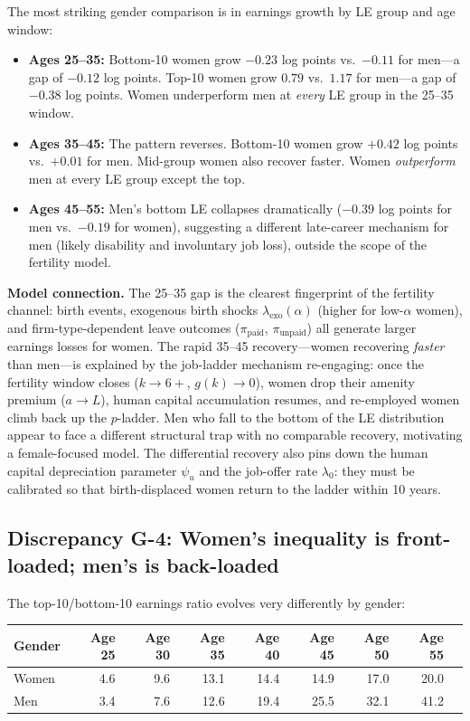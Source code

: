\documentclass[11pt]{article}
\begin{document}
The most striking gender comparison is in earnings growth by LE group and age window:
\begin{itemize}[nosep]
  \item \textbf{Ages 25--35:} Bottom-10 women grow $-0.23$ log points vs.\ $-0.11$ for men---a gap of $-0.12$ log points. Top-10 women grow $0.79$ vs.\ $1.17$ for men---a gap of $-0.38$ log points. Women underperform men at \emph{every} LE group in the 25--35 window.
  \item \textbf{Ages 35--45:} The pattern reverses. Bottom-10 women grow $+0.42$ log points vs.\ $+0.01$ for men. Mid-group women also recover faster. Women \emph{outperform} men at every LE group except the top.
  \item \textbf{Ages 45--55:} Men's bottom LE collapses dramatically ($-0.39$ log points for men vs.\ $-0.19$ for women), suggesting a different late-career mechanism for men (likely disability and involuntary job loss), outside the scope of the fertility model.
\end{itemize}

\medskip\noindent\textbf{Model connection.} The 25--35 gap is the clearest fingerprint of the fertility channel: birth events, exogenous birth shocks $\lambda_{\text{exo}}(\alpha)$ (higher for low-$\alpha$ women), and firm-type-dependent leave outcomes ($\pi_{\text{paid}}$, $\pi_{\text{unpaid}}$) all generate larger earnings losses for women. The rapid 35--45 recovery---women recovering \emph{faster} than men---is explained by the job-ladder mechanism re-engaging: once the fertility window closes ($k \to 6+$, $g(k) \to 0$), women drop their amenity premium ($a \to L$), human capital accumulation resumes, and re-employed women climb back up the $p$-ladder. Men who fall to the bottom of the LE distribution appear to face a different structural trap with no comparable recovery, motivating a female-focused model. The differential recovery also pins down the human capital depreciation parameter $\psi_u$ and the job-offer rate $\lambda_0$: they must be calibrated so that birth-displaced women return to the ladder within 10 years.

\subsection{Discrepancy G-4: Women's inequality is front-loaded; men's is back-loaded}

The top-10/bottom-10 earnings ratio evolves very differently by gender:
\begin{center}
\begin{tabular}{lrrrrrrrr}
\toprule
Gender & Age 25 & Age 30 & Age 35 & Age 40 & Age 45 & Age 50 & Age 55 \\
\midrule
Women & 4.6 & 9.6 & 13.1 & 14.4 & 14.9 & 17.0 & 20.0 \\
Men   & 3.4 & 7.6 & 12.6 & 19.4 & 25.5 & 32.1 & 41.2 \\
\bottomrule
\end{tabular}
\end{center}
\end{document}
